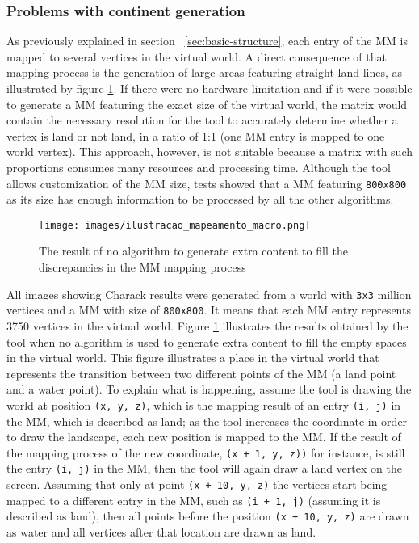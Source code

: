 \documentclass[10pt, conference, compsocconf]{IEEEtran}
\begin{document}
\subsubsection{Problems with continent generation}
\label{sec:visaomicromacro}

As previously explained in section ~\ref{sec:basic-structure}, each entry of the MM is mapped to several vertices in the virtual world. A direct consequence of that mapping process is the generation of large areas featuring straight land lines, as illustrated by figure \ref{fig:ilustracao_mapeamento_macro}. If there were no hardware limitation and if it were possible to generate a MM featuring the exact size of the virtual world, the matrix would contain the necessary resolution for the tool to accurately determine whether a vertex is land or not land, in a ratio of 1:1 (one MM entry is mapped to one world vertex). This approach, however, is not suitable because a matrix with such proportions consumes many resources and processing time. Although the tool allows customization of the MM size, tests showed that a MM featuring {\tt 800x800} as its size has enough information to be processed by all the other algorithms.

\begin{figure}
\centering
\texttt{[image: images/ilustracao\_mapeamento\_macro.png]}
\caption{The result of no algorithm to generate extra content to fill the discrepancies in the MM mapping process}
\label{fig:ilustracao_mapeamento_macro}
\end{figure}

All images showing Charack results were generated from a world with {\tt 3x3} million vertices and a MM with size of {\tt 800x800}. It means that each MM entry represents 3750 vertices in the virtual world. Figure \ref{fig:ilustracao_mapeamento_macro} illustrates the results obtained by the tool when no algorithm is used to generate extra content to fill the empty spaces in the virtual world. This figure illustrates a place in the virtual world that represents the transition between two different points of the MM (a land point and a water point). To explain what is happening, assume the tool is drawing the world at position {\tt (x, y, z)}, which is the mapping result of an entry {\tt (i, j)} in the MM, which is described as land; as the tool increases the coordinate in order to draw the landscape, each new position is mapped to the MM. If the result of the mapping process of the new coordinate, {\tt (x + 1, y, z))} for instance, is still the entry {\tt (i, j)} in the MM, then the tool will again draw a land vertex on the screen. Assuming that only at point {\tt (x + 10, y, z)} the vertices start being mapped to a different entry in the MM, such as {\tt (i + 1, j)} (assuming it is described as land), then all points before the position {\tt (x + 10, y, z)} are drawn as water and all vertices after that location are drawn as land.
\end{document}
